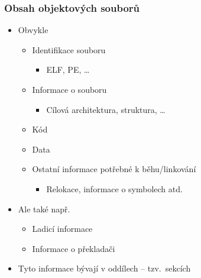 \begin{frame}
  \frametitle{Obsah objektových souborů}

  \begin{itemize}
    \item Obvykle
    \begin{itemize}
      \item Identifikace souboru
      \begin{itemize}
	\item ELF, PE, \dots
      \end{itemize}

      \pause

      \item Informace o souboru
      \begin{itemize}
	\item Cílová architektura, struktura, \dots
      \end{itemize}

      \pause

      \item Kód
      \item Data

      \pause

      \item Ostatní informace potřebné k běhu/linkování
      \begin{itemize}
	\item Relokace, informace o symbolech atd.
      \end{itemize}
    \end{itemize}

    \pause

    \item Ale také např.
    \begin{itemize}
      \item Ladicí informace
      \item Informace o překladači
    \end{itemize}

    \pause

    \item Tyto informace bývají v oddílech -- tzv.\ sekcích

  \end{itemize}

\end{frame}

